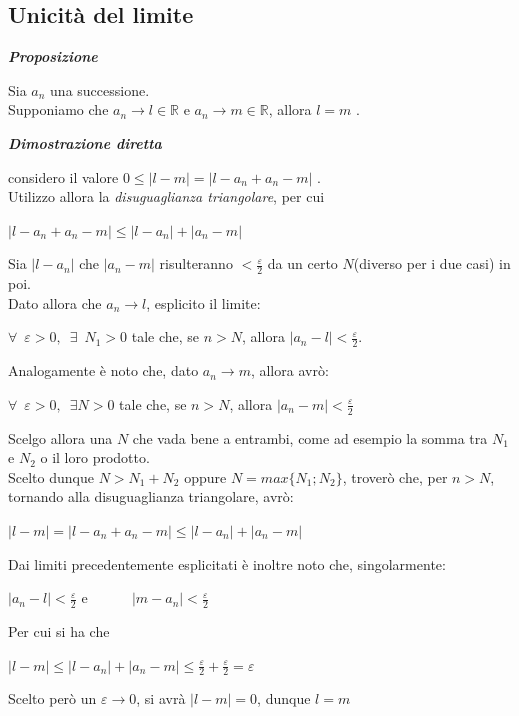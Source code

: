 \documentclass{article}
\theoremstyle{definition}
\begin{document}
\subsection{Unicità del limite}
\begin{center}
    \textbf{\textit{Proposizione}}
\end{center}
Sia $a_n$ una successione.
\\
Supponiamo che $a_n \to l \in \mathbb{R}$ e $a_n \to m \in \mathbb{R}$, allora $l=m$
.
\begin{center}
    \textbf{\textit{Dimostrazione diretta}}
\end{center}
considero il valore $0 \leqslant|l-m|=|l-a_n+a_n-m|$
.
\\ Utilizzo allora la \textit{disuguaglianza triangolare}, per cui
\begin{center}
    $|l-a_n+a_n-m| \leqslant |l-a_n|+|a_n-m|$
\end{center}
Sia $|l-a_n|$ che $|a_n-m|$ risulteranno $< \frac{\varepsilon}{2}$ da un certo $N$(diverso per i due casi) in poi.
\\
Dato allora che $a_n \to l$, esplicito il limite:
\begin{center}
    $\forall \,\,\, \varepsilon >0, \,\,\, \exists \,\,\, N_1>0$ tale che, se $n>N$, allora $|a_n-l|< \frac{\varepsilon}{2}$.
\end{center}
Analogamente è noto che, dato $a_n \to m$, allora avrò:
\begin{center}
    $\forall \,\,\, \varepsilon>0, \,\,\, \exists N>0$ tale che, se $n>N$, allora $|a_n-m|<\frac{\varepsilon}{2}$
\end{center}
Scelgo allora una $N$ che vada bene a entrambi, come ad esempio la somma tra $N_1$ e $N_2$ o il loro prodotto.
\\
Scelto dunque $N>N_1+N_2$ oppure $N=max\{N_1;N_2\}$, troverò che, per $n>N$, tornando alla disuguaglianza triangolare, avrò:
\begin{center}
    $|l-m|=|l-a_n+a_n-m| \leqslant |l-a_n|+|a_n-m|$
\end{center}
Dai limiti precedentemente esplicitati è inoltre noto che, singolarmente:
\begin{center}
    $|a_n-l|<\frac{\varepsilon}{2}$ e \,\,\,\,\,\,\,\,\,\,\,\,\,\,\, $|m-a_n|<\frac{\varepsilon}{2}$
\end{center}
Per cui si ha che
\begin{center}
    $|l-m|\leqslant |l-a_n|+|a_n-m| \leqslant \frac{\varepsilon}{2}+ \frac{\varepsilon}{2}= \varepsilon$
\end{center}
Scelto però un $\varepsilon \to 0$, si avrà $|l-m|=0$, dunque $l=m$
\end{document}
